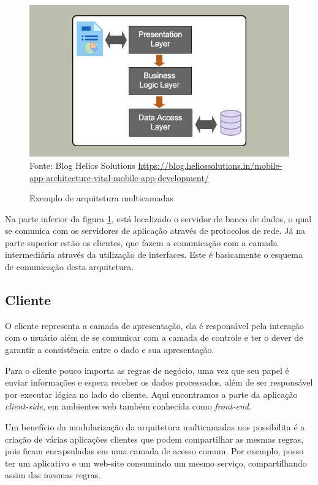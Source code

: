 \documentclass[
	12pt,				%
	openright,			%
	twoside,			%
	a4paper,			%
	english,			%
	brazil				%
	]{abntex2}
\begin{document}
\begin{figure}[h]
	\centering

	\caption{Exemplo de arquitetura multicamadas} \label{fig:MultilayerArchitecture}
    \includegraphics[scale=0.5]{multilayer-architecture} \\
    Fonte: {Blog Helios Solutions \url{https://blog.heliossolutions.in/mobile-app-architecture-vital-mobile-app-development/}}

\end{figure}

Na parte inferior da figura \ref{fig:MultilayerArchitecture}, está localizado o servidor de banco de dados, o qual se comunica com os servidores de aplicação através de protocolos de rede. Já na parte superior estão os clientes, que fazem a comunicação com a camada intermediária através da utilização de interfaces. Este é basicamente o esquema de comunicação desta arquitetura.

\subsection{Cliente}
\label{subsec:Cliente}

O cliente representa a camada de apresentação, ela é responsável pela interação com o usuário além de se comunicar com a camada de controle e ter o dever de garantir a consistência entre o dado e sua apresentação.

Para o cliente pouco importa as regras de negócio, uma vez que seu papel é enviar informações e espera receber os dados processados, além de ser responsável por executar lógica no lado do cliente. Aqui encontramos a parte da aplicação \textit{client-side}, em ambientes web também conhecida como \textit{front-end}.

Um benefício da modularização da arquitetura multicamadas nos possibilita é a criação de várias aplicações clientes que podem compartilhar as mesmas regras, pois ficam encapsuladas em uma camada de acesso comum. Por exemplo, posso ter um aplicativo e um web-site consumindo um mesmo serviço, compartilhando assim das mesmas regras.
\end{document}
